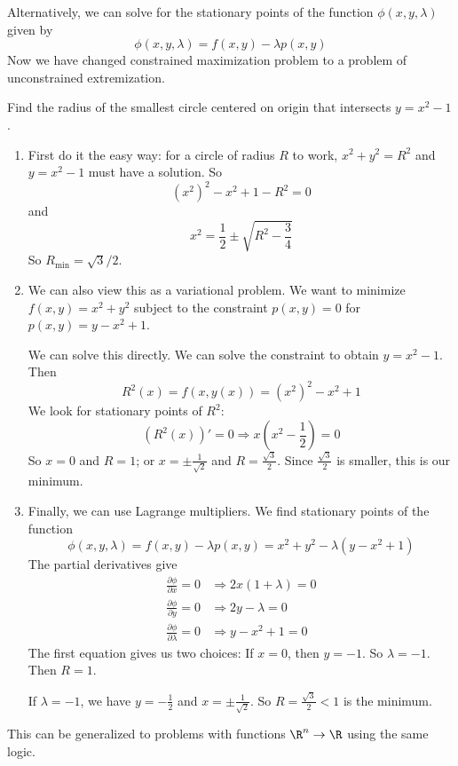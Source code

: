 \documentclass[a4paper]{article}
\begin{document}
Alternatively, we can solve for the stationary points of the function $\phi(x, y, \lambda)$ given by
\[
  \phi(x, y, \lambda) = f(x, y) - \lambda p(x, y)
\]
Now we have changed constrained maximization problem to a problem of unconstrained extremization.

\begin{eg}
  Find the radius of the smallest circle centered on origin that intersects $y = x^2 - 1$.

  \begin{enumerate}
    \item  First do it the easy way: for a circle of radius $R$ to work, $x^2 + y^2 = R^2$ and $y = x^2 - 1$ must have a solution. So
      \[
        (x^2)^2 - x^2 + 1 - R^2 = 0
      \]
      and
      \[
        x^2 = \frac{1}{2}\pm \sqrt{R^2 - \frac{3}{4}}
      \]
      So $R_{\min} = \sqrt{3}/2$.

    \item We can also view this as a variational problem. We want to minimize $f(x, y) = x^2 + y^2$ subject to the constraint $p(x, y) = 0$ for $p(x, y) = y - x^2 + 1$.

      We can solve this directly. We can solve the constraint to obtain $y = x^2 - 1$. Then 
      \[
        R^2(x) = f(x, y(x)) = (x^2)^2 - x^2  + 1
      \]
      We look for stationary points of $R^2$:
      \[
        (R^2(x))' = 0 \Rightarrow  x\left(x^2 - \frac{1}{2}\right)= 0
      \]
      So $x = 0$ and $R = 1$; or $x = \pm \frac{1}{\sqrt{2}}$ and $R = \frac{\sqrt{3}}{2}$. Since $\frac{\sqrt{3}}{2}$ is smaller, this is our minimum.

    \item Finally, we can use Lagrange multipliers. We find stationary points of the function 
      \[
        \phi(x, y, \lambda) = f(x, y) - \lambda p(x, y) = x^2 + y^2 - \lambda (y - x^2 + 1)
      \]
      The partial derivatives give
      \begin{align*}
        \frac{\partial \phi}{\partial x} = 0 &\Rightarrow 2x(1 + \lambda) = 0\\
        \frac{\partial \phi}{\partial y} = 0 &\Rightarrow 2y - \lambda = 0\\
        \frac{\partial \phi}{\partial \lambda} = 0 &\Rightarrow y - x^2 + 1 = 0
      \end{align*}
      The first equation gives us two choices: If $x = 0$, then $y = -1$. So $\lambda = -1$. Then $R = 1$.

      If $\lambda = -1$, we have $y = -\frac{1}{2}$ and $x = \pm \frac{1}{\sqrt{2}}$. So $R = \frac{\sqrt{3}}{2} < 1$ is the minimum.
  \end{enumerate}
\end{eg}
This can be generalized to problems with functions $\R^n \to \R$ using the same logic.
\end{document}
